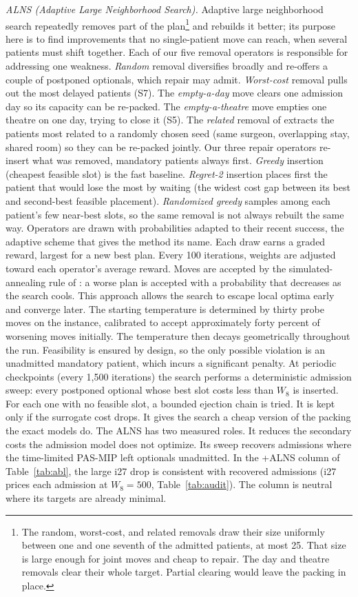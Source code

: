 \documentclass[11pt]{article}
\newcommand{\Sc}[1]{\textsf{S#1}}
\newcommand{\anote}[1]{\footnote{#1}}
\begin{document}
	\emph{ALNS (Adaptive Large Neighborhood Search).} Adaptive large neighborhood search \citep{ropke2006} repeatedly removes part of the plan\anote{The random, worst-cost, and related removals draw their size uniformly between one and one seventh of the admitted patients, at most 25. That size is large enough for joint moves and cheap to repair. The day and theatre removals clear their whole target. Partial clearing would leave the packing in place.} and
	rebuilds it better; its purpose here is to find improvements that no single-patient move can reach, when several patients must shift together. Each of our five removal operators is responsible for addressing one weakness. \emph{Random} removal diversifies broadly and re-offers a couple of postponed optionals, which repair may admit. \emph{Worst-cost} removal pulls out the most delayed patients (\Sc7). The \emph{empty-a-day} move clears one admission day so its capacity can be re-packed. The \emph{empty-a-theatre} move empties one theatre on one day, trying to close it (\Sc5). The \emph{related} removal of \citet{shaw1998} extracts the patients most related to a randomly chosen seed (same surgeon, overlapping stay, shared room) so they can be re-packed jointly. Our three repair operators re-insert what was removed, mandatory patients always first. \emph{Greedy} insertion (cheapest feasible slot) is the fast baseline. \emph{Regret-2} insertion places first the patient that would lose the most by waiting (the widest cost gap between its best and second-best feasible placement). \emph{Randomized greedy} samples among each patient's few near-best slots, so the same removal is not always rebuilt the same way. Operators are drawn with probabilities adapted to their recent success, the adaptive scheme that gives the method its name. Each draw earns a graded reward, largest for a new best plan. Every 100 iterations, weights are adjusted toward each operator’s average reward. Moves are accepted by the simulated-annealing rule of \citet{kirkpatrick1983}: a worse plan is accepted with a probability that decreases as the search cools. This approach allows the search to escape local optima early and converge later. The starting temperature is determined by thirty probe moves on the instance, calibrated to accept approximately forty percent of worsening moves initially. The temperature then decays geometrically throughout the run. Feasibility is ensured by design, so the only possible violation is an unadmitted mandatory patient, which incurs a significant penalty. At periodic checkpoints (every 1{,}500
	iterations) the search performs a deterministic admission sweep: every postponed optional whose best slot costs less than $W_8$ is
	inserted. For each one with no feasible slot, a bounded ejection chain is tried. It is kept only if the surrogate cost drops. It gives the search a cheap version of the packing the exact models do. The ALNS has two measured roles. It reduces the secondary costs the admission model does not optimize. Its sweep recovers admissions where the time-limited PAS-MIP left optionals unadmitted. In the +ALNS column of Table~\ref{tab:abl}, the large i27 drop is consistent with recovered admissions (i27 prices each admission at $W_8=500$, Table~\ref{tab:audit}). The column is neutral where its targets are already minimal.
	
\end{document}
